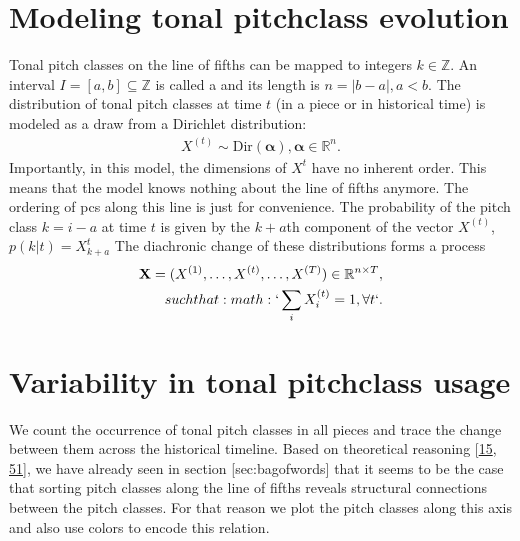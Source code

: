\documentclass[letterpaper,10pt,english]{sphinxmanual}
\begin{document}
\section{Modeling tonal pitch\sphinxhyphen{}class evolution}
\label{\detokenize{5_notes:modeling-tonal-pitch-class-evolution}}
\sphinxAtStartPar
Tonal pitch classes on the line of fifths can be mapped to integers
\(k \in \mathbb Z\). An interval \(I=[a,b]\subseteq\mathbb Z\)
is called a  and its length is
\(n=|b-a|, a<b\). The distribution of tonal pitch classes at time
\(t\) (in a piece or in historical time) is modeled as a draw from a
Dirichlet distribution:
\begin{equation*}
\begin{split}X^{(t)}\sim \mathrm{Dir}(\mathbf{\alpha}), \mathbf{\alpha}\in\mathbb R^n.\end{split}
\end{equation*}
\sphinxAtStartPar
Importantly, in this model, the dimensions of \(X^{t}\) have no
inherent order. This means that the model knows nothing about the line
of fifths anymore. The ordering of pcs along this line is just for
convenience. The probability of the pitch class \(k = i-a\) at time
\(t\) is given by the \(k+a\)th component of the vector
\(X^{(t)}\), \(p(k | t)=X_{k+a}^{t}\) The diachronic change of
these distributions forms a process
\begin{align*}\!\begin{aligned}
\mathbf{X}=(X^{(1)},\dots,X^{(t)},\dots,X^{(T)})\in \mathbb R^{n\times T},\\
such that :math:`\sum_i X_i^{(t)}=1,\forall t`.\\
\end{aligned}\end{align*}

\section{Variability in tonal pitch\sphinxhyphen{}class usage}
\label{\detokenize{5_notes:variability-in-tonal-pitch-class-usage}}
\sphinxAtStartPar
We count the occurrence of tonal pitch classes in all pieces and trace
the change between them across the historical timeline. Based on
theoretical reasoning {[}\hyperlink{cite.8_bibliography:id53}{15}, \hyperlink{cite.8_bibliography:id30}{51}{]},
we have already seen in section {[}sec:bagofwords{]} that it seems to be the
case that sorting pitch classes along the line of fifths reveals
structural connections between the pitch classes. For that reason we
plot the pitch classes along this axis and also use colors to encode
this relation.
\end{document}
